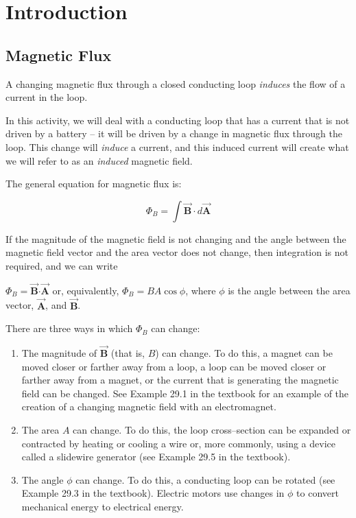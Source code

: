 \documentclass{article}
\newcommand{\bfvec}[1]{\vec{\mathbf{#1}}}
\newcommand{\bfcdot}[0]{\boldsymbol{\cdot}}
\begin{document}
\section{Introduction}

\subsection{Magnetic Flux}

A changing magnetic flux through a closed conducting loop \emph{induces} the flow of a current in the loop.

In this activity, we will deal with a conducting loop that has a current that is not driven by a battery -- it will be driven by a change in magnetic flux through the loop. This change will \emph{induce} a current, and this induced current will create what we will refer to as an \emph{induced} magnetic field.

The general equation for magnetic flux is:

$$
\Phi_B = \int \bfvec{B}\cdot d\bfvec{A}
$$

If the magnitude of the magnetic field is not changing and the angle between the magnetic field vector and the area vector does not change, then integration is not required, and we can write

$
\Phi_B = \bfvec{B}\bfcdot \bfvec{A}
$
or, equivalently, $\Phi_B = BA\cos\phi$, where $\phi$ is the angle between the area vector, $\bfvec{A}$, and $\bfvec{B}$.

There are three ways in which $\Phi_B$ can change:

\begin{enumerate}

  \item The magnitude of $\bfvec{B}$ (that is, $B$) can change. To do this, a magnet can be moved closer or farther away from a loop, a loop can be moved closer or farther away from a magnet, or the current that is generating the magnetic field can be changed. See Example 29.1 in the textbook for an example of the creation of a changing magnetic field with an electromagnet.

  \item The area $A$ can change. To do this, the loop cross--section can be expanded or contracted by heating or cooling a wire or, more commonly, using a device called a slidewire generator (see Example 29.5 in the textbook).

  \item The angle $\phi$ can change. To do this, a conducting loop can be rotated (see Example 29.3 in the textbook). Electric motors use changes in $\phi$ to convert mechanical energy to electrical energy.

\end{enumerate}
\end{document}
